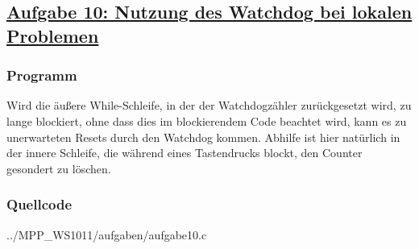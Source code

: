 \subsection*
{\href{http://cst.mi.fu-berlin.de/intern/19606-P-MPP/Aufgaben/040302.html}
{Aufgabe 10: Nutzung des Watchdog bei lokalen Problemen}}

\subsubsection*{Programm}
Wird die äußere While-Schleife, in der der Watchdogzähler zurückgesetzt wird, zu lange
blockiert, ohne dass dies im blockierendem Code beachtet wird, kann es zu unerwarteten
Resets durch den Watchdog kommen. Abhilfe ist hier natürlich in der innere Schleife, die
während eines Tastendrucks blockt, den Counter gesondert zu löschen.


\subsubsection*{Quellcode}

{../MPP_WS1011/aufgaben/aufgabe10.c}

\begin{comment}
Wie können Sie registrieren und speichern, wann und an welcher Programmstelle der Watchdog das System neu gestartet hat.

Skizzieren Sie einen Lösungsansatz. Als Hilfestellung hier folgende Stichwörter:

    NMI-Interrupt
    Stackpointer
    Programcounter
    Softwarereset
    INFOMEM
\end{comment}
